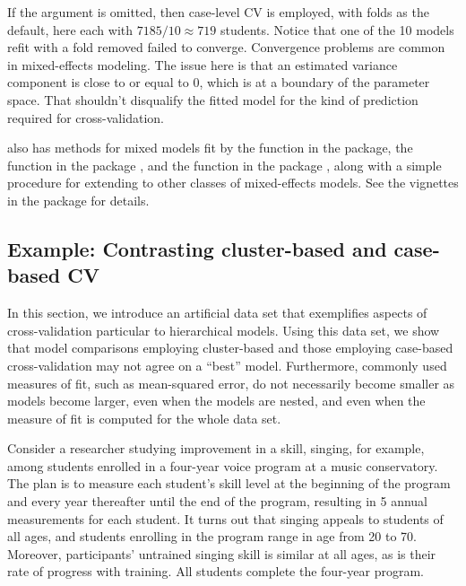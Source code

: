 \documentclass[
]{jss}
\begin{document}
If the  argument is omitted, then case-level CV
is employed, with  folds as the default, here each with
\(7185/10 \approx 719\) students. Notice that one of the 10 models refit
with a fold removed failed to converge. Convergence problems are common
in mixed-effects modeling. The issue here is that an estimated variance
component is close to or equal to 0, which is at a boundary of the
parameter space. That shouldn't disqualify the fitted model for the kind
of prediction required for cross-validation.

 also has methods for mixed models fit by the 
function in the  package, the  function in the
 package \citep{PinheiroBates:2000}, and the 
function in the  package \citep{BrooksEtAl}, along with a
simple procedure for extending  to other classes of
mixed-effects models. See the vignettes in the  package for
details.

\hypertarget{example-contrasting-cluster-based-and-case-based-cv}{%
\subsection{Example: Contrasting cluster-based and case-based
CV}\label{example-contrasting-cluster-based-and-case-based-cv}}

In this section, we introduce an artificial data set that exemplifies
aspects of cross-validation particular to hierarchical models. Using
this data set, we show that model comparisons employing cluster-based
and those employing case-based cross-validation may not agree on a
``best'' model. Furthermore, commonly used measures of fit, such as
mean-squared error, do not necessarily become smaller as models become
larger, even when the models are nested, and even when the measure of
fit is computed for the whole data set.

Consider a researcher studying improvement in a skill, singing, for
example, among students enrolled in a four-year voice program at a music
conservatory. The plan is to measure each student's skill level at the
beginning of the program and every year thereafter until the end of the
program, resulting in 5 annual measurements for each student. It turns
out that singing appeals to students of all ages, and students enrolling
in the program range in age from 20 to 70. Moreover, participants'
untrained singing skill is similar at all ages, as is their rate of
progress with training. All students complete the four-year program.
\end{document}

